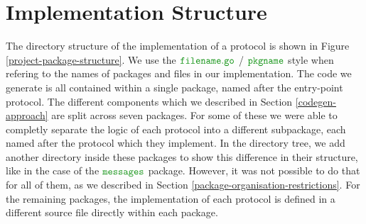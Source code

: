 \documentclass[12pt,twoside]{report}
\begin{document}


    

\section{Implementation Structure}\label{project-structure}

The directory structure of the implementation of a protocol is shown in Figure \ref{project-package-structure}. We use the $\filename{filename}$ / $\pkgname{pkgname}$ style when refering to the names of packages and files in our implementation. The code we generate is all contained within a single package, named after the entry-point protocol. The different components which we described in Section \ref{codegen-approach} are split across seven packages. For some of these we were able to completly separate the logic of each protocol into a different subpackage, each named after the protocol which they implement. In the directory tree, we add another directory inside these packages to show this difference in their structure, like in the case of the $\pkgname{messages}$ package. However, it was not possible to do that for all of them, as we described in Section \ref{package-organisation-restrictions}. For the remaining packages, the implementation of each protocol is defined in a different source file directly within each package.\\
\end{document}
